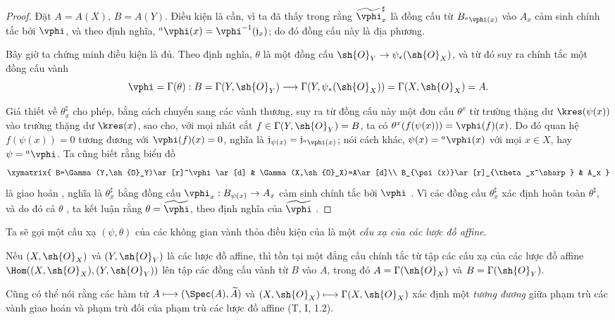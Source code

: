 \documentclass[oneside]{amsart}
\makeatletter
\newcommand{\ega@arrow}[2]{\mathchoice{#1}{#2}{#2}{#2}}
\renewcommand{\to}{\ega@arrow{\longrightarrow}{\rightarrow}}
\newcommand{\oldpage}[2][]{{\marginnote{\normalfont\textbf{#1}~|~#2}}\ignorespaces}
\let\EGAOriginalLabel\label
\renewcommand{\label}[1]{\phantomsection\EGAOriginalLabel{#1}}
\makeatother
\begin{document}
\begin{proof}
\oldpage[I]{97}
Đặt $A=A(X)$, $B=A(Y)$.
Điều kiện là cần, vì ta đã thấy trong  rằng
$\widetilde{\vphi}_x^\sharp$ là đồng cấu từ
$B_{{}^a\vphi(x)}$ vào $A_x$ cảm sinh chính tắc bởi $\vphi$, và theo
định nghĩa, ${}^a\vphi(x)=\vphi^{-1}(\mathfrak{j}_x)$; do đó đồng cấu
này là địa phương.

Bây giờ ta chứng minh điều kiện là đủ.
Theo định nghĩa, $\theta$ là một đồng cấu
$\sh{O}_Y\to\psi_*(\sh{O}_X)$, và từ đó suy ra chính tắc một đồng cấu vành
\[
  \vphi=\Gamma(\theta):B=\Gamma(Y,\sh{O}_Y)
  \to\Gamma(Y,\psi_*(\sh{O}_X))=\Gamma(X,\sh{O}_X)=A.
\]

Giả thiết về $\theta_x^\sharp$ cho phép, bằng cách chuyển sang các vành
thương, suy ra từ đồng cấu này một đơn cấu $\theta^x$ từ trường thặng dư
$\kres(\psi(x))$ vào trường thặng dư $\kres(x)$, sao cho, với mọi nhát cắt
$f\in\Gamma(Y,\sh{O}_Y)=B$, ta có
$\theta^x(f(\psi(x)))=\vphi(f)(x)$.
Do đó quan hệ $f(\psi(x))=0$ tương đương với
$\vphi(f)(x)=0$, nghĩa là
$\mathfrak{j}_{\psi(x)}=\mathfrak{j}_{{}^a\vphi(x)}$; nói cách khác,
$\psi(x)={}^a\vphi(x)$ với mọi $x\in X$, hay
$\psi={}^a\vphi$.
Ta cũng biết rằng biểu đồ
\[
  \xymatrix{
    B=\Gamma(Y,\sh{O}_Y)\ar[r]^\vphi\ar[d] &
    \Gamma(X,\sh{O}_X)=A\ar[d]\\
    B_{\psi(x)}\ar[r]_{\theta_x^\sharp} &
    A_x
  }
\]
là giao hoán , nghĩa là $\theta_x^\sharp$ bằng đồng cấu
$\vphi_x:B_{\psi(x)}\to A_x$ cảm sinh chính tắc bởi $\vphi$
.
Vì các đồng cấu $\theta_x^\sharp$ xác định hoàn toàn $\theta^\sharp$, và
do đó cả $\theta$ , ta kết luận rằng
$\theta=\widetilde{\vphi}$, theo định nghĩa của $\widetilde{\vphi}$
.
\end{proof}

Ta sẽ gọi một cấu xạ $(\psi,\theta)$ của các không gian vành thỏa điều kiện
của  là một \emph{cấu xạ của các lược đồ affine}.

\begin{corollary}[1.7.4]
\label{I.1.7.4}
Nếu $(X,\sh{O}_X)$ và $(Y,\sh{O}_Y)$ là các lược đồ affine, thì tồn tại
một đẳng cấu chính tắc từ tập các cấu xạ của các lược đồ affine
$\Hom((X,\sh{O}_X),(Y,\sh{O}_Y))$ lên tập các đồng cấu vành từ $B$ vào
$A$, trong đó $A=\Gamma(\sh{O}_X)$ và $B=\Gamma(\sh{O}_Y)$.
\end{corollary}

Cũng có thể nói rằng các hàm tử
$A\longmapsto(\Spec(A),\widetilde{A})$ và
$(X,\sh{O}_X)\longmapsto\Gamma(X,\sh{O}_X)$ xác định một
\emph{tương đương} giữa phạm trù các vành giao hoán và phạm trù đối của
phạm trù các lược đồ affine (T, I, 1.2).
\end{document}
